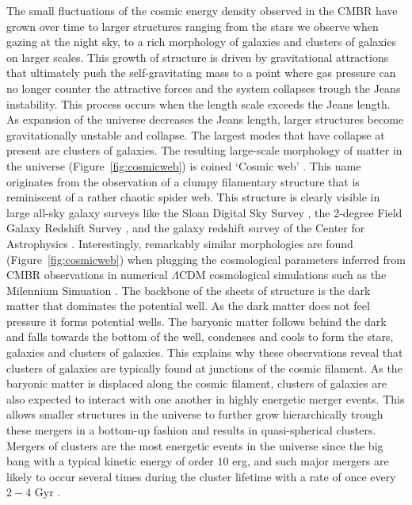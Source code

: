 \documentclass[MScProj_TLRH_ClusterEnergy.tex]{subfiles}
\begin{document}
The small fluctuations of the cosmic energy density observed in the CMBR have 
grown over time to larger structures ranging from the stars we observe when 
gazing at the night sky, to a rich morphology of galaxies and clusters of galaxies 
on larger scales. This growth of structure is driven by gravitational attractions
that ultimately push the self-gravitating mass to a point where gas pressure can
no longer counter the attractive forces and the system collapses trough the Jeans
instability. This process occurs when the length scale exceeds the Jeans length.
As expansion of the universe decreases the Jeans length, larger structures become 
gravitationally unstable and collapse. The largest modes that have collapse at 
present are clusters of galaxies. The resulting large-scale morphology of matter
in the universe (Figure~\ref{fig:cosmicweb}) is coined `Cosmic web' 
\citep{1996Natur.380..603B}.  This name originates from the observation of a clumpy
filamentary structure that is reminiscent of a rather chaotic spider web. This 
structure is clearly visible in large all-sky galaxy surveys like the Sloan Digital
Sky Survey \citep[SDSS;][]{2000AJ....120.1579Y}, the 2-degree Field Galaxy Redshift
Survey \citep[2dFGRS;][]{2001MNRAS.328.1039C}, and the galaxy redshift survey of the 
Center for Astrophysics \citep[CfA;][]{1989Sci...246..897G}. Interestingly, 
remarkably similar morphologies are found (Figure~\ref{fig:cosmicweb}) when 
plugging the  cosmological parameters inferred from CMBR observations in numerical
$\Lambda$CDM cosmological simulations such as the Milennium Simuation
\citep{2005Natur.435..629S}. The backbone of the sheets of structure is the dark
matter that dominates the potential well. As the dark matter does not feel 
pressure it forms potential wells. The baryonic matter follows behind the dark
and falls towards the bottom of the well, condenses and cools to form the stars, 
galaxies and clusters of galaxies. This explains why these observations reveal
that clusters of galaxies are typically found at junctions of the cosmic filament.
As the baryonic matter is displaced along the cosmic filament, clusters of galaxies are
also expected to interact with one another in highly energetic merger events. This 
allows smaller structures in the universe to further grow hierarchically trough 
these mergers in a bottom-up fashion \citep{1974ApJ...187..425P} and results in 
quasi-spherical clusters. Mergers of clusters are the most energetic events in
the universe since the big bang with a typical kinetic energy of order $10$
erg, and such major mergers are likely to occur several times during the cluster 
lifetime with a rate of once every $2-4$ Gyr \citep{1990MNRAS.245..559E, 1992MNRAS.258..177E}. 
\end{document}
